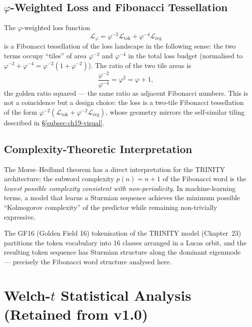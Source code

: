 \subsection{\(\varphi\)-Weighted Loss and Fibonacci Tessellation}
\label{subsec:ch19-phi-loss}

The \(\varphi\)-weighted loss function
\[
  \mathcal{L}_\varphi
  = \varphi^{-2}\mathcal{L}_{\text{tok}} + \varphi^{-4}\mathcal{L}_{\text{reg}}
\]
is a Fibonacci tessellation of the loss landscape in the following
sense: the two terms occupy ``tiles'' of area \(\varphi^{-2}\)
and \(\varphi^{-4}\) in the total loss budget (normalised to
\(\varphi^{-2}+\varphi^{-4}=\varphi^{-2}(1+\varphi^{-2})\)).
The ratio of the two tile areas is
\[
  \frac{\varphi^{-2}}{\varphi^{-4}} = \varphi^2 = \varphi+1,
\]
the golden ratio squared --- the same ratio as adjacent Fibonacci
numbers.  This is not a coincidence but a design choice: the
loss is a two-tile Fibonacci tessellation of the form
\(\varphi^{-2}(\mathcal{L}_{\mathrm{tok}}+\varphi^{-2}\mathcal{L}_{\mathrm{reg}})\),
whose geometry mirrors the self-similar tiling described in
\S\ref{subsec:ch19-visual}.

\subsection{Complexity-Theoretic Interpretation}
\label{subsec:ch19-complexity-interp}

The Morse--Hedlund theorem has a direct interpretation for the
TRINITY architecture: the subword complexity \(p(n)=n+1\) of the
Fibonacci word is the \emph{lowest possible complexity consistent
with non-periodicity}.  In machine-learning terms, a model that
learns a Sturmian sequence achieves the minimum possible
``Kolmogorov complexity'' of the predictor while remaining
non-trivially expressive.

The GF16 (Golden Field 16) tokenisation of the TRINITY model
(Chapter~23) partitions the token vocabulary into 16 classes
arranged in a Lucas orbit, and the resulting token sequence has
Sturmian structure along the dominant eigenmode --- precisely
the Fibonacci word structure analysed here.

\section{Welch-$t$ Statistical Analysis (Retained from v1.0)}
\label{sec:ch19-welch-retained}

